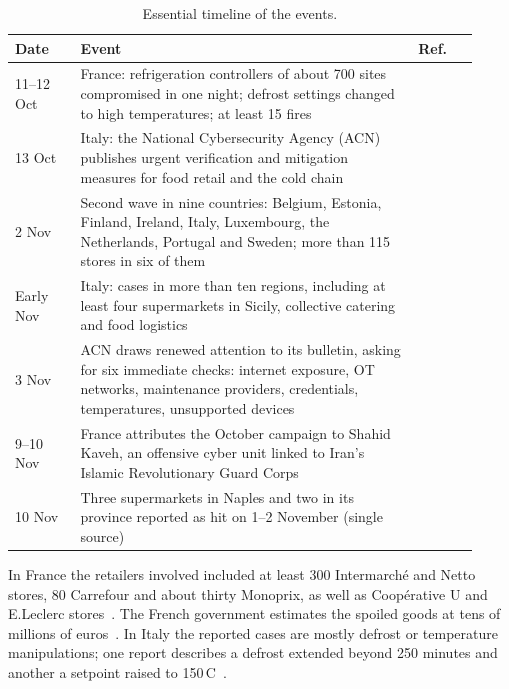 \documentclass{ceurart}
\newcommand{\degC}{\,\textdegree{}C}
\begin{document}
\begin{table}[ht]
  \caption{Essential timeline of the events.}
  \label{tab:timeline}
  \begin{tabular}{@{}p{0.13\linewidth}p{0.67\linewidth}p{0.12\linewidth}@{}}
    \toprule
    Date & Event & Ref. \\
    \midrule
    11--12 Oct & France: refrigeration controllers of about 700 sites compromised in one night; defrost settings changed to high temperatures; at least 15 fires & \cite{anssi2026attribution,certfr2026cti009} \\
    13 Oct & Italy: the National Cybersecurity Agency (ACN) publishes urgent verification and mitigation measures for food retail and the cold chain & \cite{cyber360acn2026} \\
    2 Nov & Second wave in nine countries: Belgium, Estonia, Finland, Ireland, Italy, Luxembourg, the Netherlands, Portugal and Sweden; more than 115 stores in six of them & \cite{euronews2026nine,bleeping2026wave} \\
    Early Nov & Italy: cases in more than ten regions, including at least four supermarkets in Sicily, collective catering and food logistics & \cite{euronews2026nine,cyber360cases2026} \\
    3 Nov & ACN draws renewed attention to its bulletin, asking for six immediate checks: internet exposure, OT networks, maintenance providers, credentials, temperatures, unsupported devices & \cite{cyber360acn2026} \\
    9--10 Nov & France attributes the October campaign to Shahid Kaveh, an offensive cyber unit linked to Iran's Islamic Revolutionary Guard Corps & \cite{anssi2026attribution,mfa2026attribution} \\
    10 Nov & Three supermarkets in Naples and two in its province reported as hit on 1--2 November (single source) & \cite{fanpage2026napoli} \\
    \bottomrule
  \end{tabular}
\end{table}

In France the retailers involved included at least 300 Intermarch\'e and Netto stores, 80 Carrefour and about thirty Monoprix, as well as Coop\'erative U and E.Leclerc stores~\cite{open2026francia}.
The French government estimates the spoiled goods at tens of millions of euros~\cite{mfa2026attribution}.
In Italy the reported cases are mostly defrost or temperature manipulations; one report describes a defrost extended beyond 250 minutes and another a setpoint raised to 150\degC~\cite{cyber360cases2026}.
\end{document}
